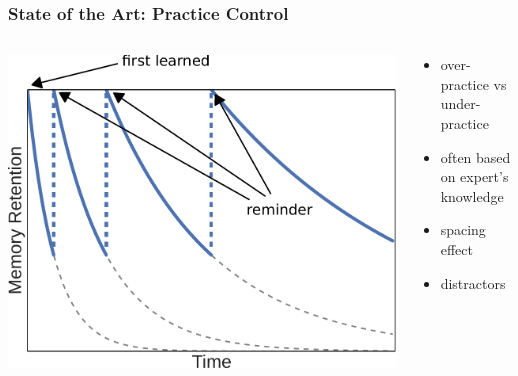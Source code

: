 \documentclass[xcolor=svgnames]{beamer}
\renewcommand{\cite}[1]{{\small\parencite{#1}}}
\begin{document}
\begin{frame}
	\frametitle{State of the Art: Practice Control}
	\begin{columns}[onlytextwidth]
		\begin{column}{0.4\textwidth}
			\includegraphics[width=1\textwidth]{figure/forgetting_curves}
		\end{column}
		\begin{column}{0.55\textwidth}
			\begin{itemize}
				\item over-practice vs under-practice\\\cite{cen2007over}
				\item often based on expert's knowledge~\cite{lopes2015multi}
				\item spacing effect~\cite{ebbinghaus1885spacing}
				\item distractors~\cite{little2015optimizing}
			\end{itemize}
		\end{column}
	\end{columns}
\end{frame}
\end{document}
